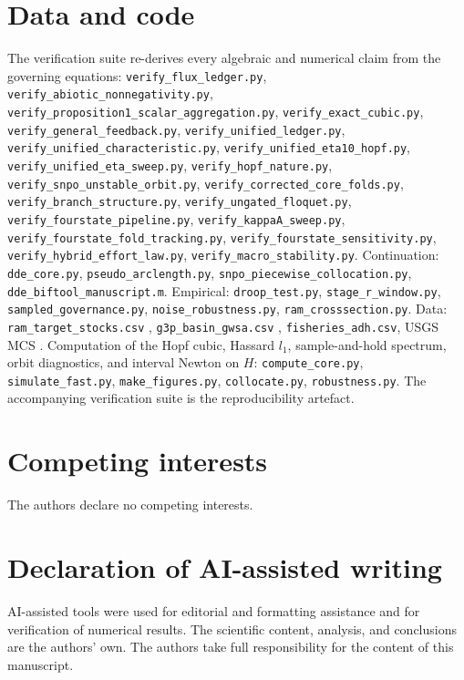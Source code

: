\documentclass[11pt]{article}
\theoremstyle{definition}
\begin{document}
\section*{Data and code}
\label{sec:data-code}
The verification suite re-derives every algebraic and numerical claim from the governing equations: \texttt{verify\_flux\_ledger.py}, \texttt{verify\_abiotic\_nonnegativity.py}, \texttt{verify\_proposition1\_scalar\_aggregation.py}, \texttt{verify\_exact\_cubic.py}, \texttt{verify\_general\_feedback.py}, \texttt{verify\_unified\_ledger.py}, \texttt{verify\_unified\_characteristic.py}, \texttt{verify\_unified\_eta10\_hopf.py}, \texttt{verify\_unified\_eta\_sweep.py}, \texttt{verify\_hopf\_nature.py}, \texttt{verify\_snpo\_unstable\_orbit.py}, \texttt{verify\_corrected\_core\_folds.py}, \texttt{verify\_branch\_structure.py}, \texttt{verify\_ungated\_floquet.py}, \texttt{verify\_fourstate\_pipeline.py}, \texttt{verify\_kappaA\_sweep.py}, \texttt{verify\_fourstate\_fold\_tracking.py}, \texttt{verify\_fourstate\_sensitivity.py}, \texttt{verify\_hybrid\_effort\_law.py}, \texttt{verify\_macro\_stability.py}. Continuation: \texttt{dde\_core.py}, \texttt{pseudo\_arclength.py}, \texttt{snpo\_piecewise\_collocation.py}, \texttt{dde\_biftool\_manuscript.m}. Empirical: \texttt{droop\_test.py}, \texttt{stage\_r\_window.py}, \texttt{sampled\_governance.py}, \texttt{noise\_robustness.py}, \texttt{ram\_crosssection.py}. Data: \texttt{ram\_target\_stocks.csv} \cite{ricard2012}, \texttt{g3p\_basin\_gwsa.csv} \cite{guentner2024}, \texttt{fisheries\_adh.csv}, USGS MCS \cite{usgsmcs}. Computation of the Hopf cubic, Hassard $l_1$, sample-and-hold spectrum, orbit diagnostics, and interval Newton on $H$: \texttt{compute\_core.py}, \texttt{simulate\_fast.py}, \texttt{make\_figures.py}, \texttt{collocate.py}, \texttt{robustness.py}. The accompanying verification suite is the reproducibility artefact.

\section*{Competing interests}
The authors declare no competing interests.

\section*{Declaration of AI-assisted writing}
AI-assisted tools were used for editorial and formatting assistance and for verification of numerical results. The scientific content, analysis, and conclusions are the authors' own. The authors take full responsibility for the content of this manuscript.
\end{document}
